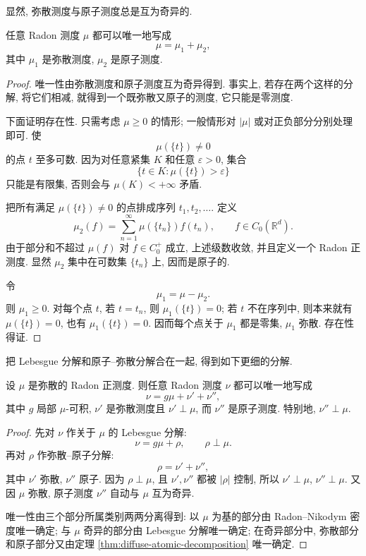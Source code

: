 显然, 弥散测度与原子测度总是互为奇异的.

\begin{thm}\label{thm:diffuse-atomic-decomposition}
	任意 Radon 测度 \(\mu\) 都可以唯一地写成
	\begin{equation}
		\mu=\mu_1+\mu_2,
		\label{eq:diffuse-atomic-decomposition}
	\end{equation}
	其中 \(\mu_1\) 是弥散测度, \(\mu_2\) 是原子测度.
\end{thm}

\begin{proof}
	唯一性由弥散测度和原子测度互为奇异得到. 事实上, 若存在两个这样的分解, 将它们相减, 就得到一个既弥散又原子的测度, 它只能是零测度.
	
	下面证明存在性. 只需考虑 \(\mu\geq0\) 的情形; 一般情形对 \(|\mu|\) 或对正负部分分别处理即可. 使
	\[
	\mu(\{t\})\neq0
	\]
	的点 \(t\) 至多可数. 因为对任意紧集 \(K\) 和任意 \(\varepsilon>0\), 集合
	\[
	\{t\in K:\mu(\{t\})>\varepsilon\}
	\]
	只能是有限集, 否则会与 \(\mu(K)<+\infty\) 矛盾.
	
	把所有满足 \(\mu(\{t\})\neq0\) 的点排成序列 \(t_1,t_2,\ldots\). 定义
	\[
	\mu_2(f)=\sum_{n=1}^{\infty}\mu(\{t_n\})f(t_n),
	\qquad f\in C_0(\mathbb{R}^d).
	\]
	由于部分和不超过 \(\mu(f)\) 对 \(f\in C_0^+\) 成立, 上述级数收敛, 并且定义一个 Radon 正测度. 显然 \(\mu_2\) 集中在可数集 \(\{t_n\}\) 上, 因而是原子的.
	
	令
	\[
	\mu_1=\mu-\mu_2.
	\]
	则 \(\mu_1\geq0\). 对每个点 \(t\), 若 \(t=t_n\), 则 \(\mu_1(\{t\})=0\); 若 \(t\) 不在序列中, 则本来就有 \(\mu(\{t\})=0\), 也有 \(\mu_1(\{t\})=0\). 因而每个点关于 \(\mu_1\) 都是零集, \(\mu_1\) 弥散. 存在性得证.
\end{proof}

把 Lebesgue 分解和原子--弥散分解合在一起, 得到如下更细的分解.

\begin{thm}\label{thm:full-lebesgue-diffuse-atomic-decomposition}
	设 \(\mu\) 是弥散的 Radon 正测度. 则任意 Radon 测度 \(\nu\) 都可以唯一地写成
	\begin{equation}
		\nu=g\mu+\nu'+\nu'',
		\label{eq:full-lebesgue-diffuse-atomic-decomposition}
	\end{equation}
	其中 \(g\) 局部 \(\mu\)-可积, \(\nu'\) 是弥散测度且 \(\nu'\perp\mu\), 而 \(\nu''\) 是原子测度. 特别地, \(\nu''\perp\mu\).
\end{thm}

\begin{proof}
	先对 \(\nu\) 作关于 \(\mu\) 的 Lebesgue 分解:
	\[
	\nu=g\mu+\rho,
	\qquad
	\rho\perp\mu.
	\]
	再对 \(\rho\) 作弥散--原子分解:
	\[
	\rho=\nu'+\nu'',
	\]
	其中 \(\nu'\) 弥散, \(\nu''\) 原子. 因为 \(\rho\perp\mu\), 且 \(\nu',\nu''\) 都被 \(|\rho|\) 控制, 所以 \(\nu'\perp\mu\), \(\nu''\perp\mu\). 又因 \(\mu\) 弥散, 原子测度 \(\nu''\) 自动与 \(\mu\) 互为奇异.
	
	唯一性由三个部分所属类别两两分离得到: 以 \(\mu\) 为基的部分由 Radon--Nikodym 密度唯一确定; 与 \(\mu\) 奇异的部分由 Lebesgue 分解唯一确定; 在奇异部分中, 弥散部分和原子部分又由定理 \ref{thm:diffuse-atomic-decomposition} 唯一确定.
\end{proof}

